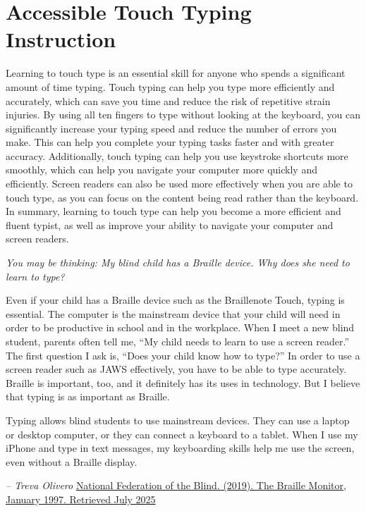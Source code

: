 \section{Accessible Touch Typing Instruction}\label{appx5}

Learning to touch type is an essential skill for anyone who spends a significant amount of time typing. Touch typing can help you type more efficiently and accurately, which can save you time and reduce the risk of repetitive strain injuries. By using all ten fingers to type without looking at the keyboard, you can significantly increase your typing speed and reduce the number of errors you make. This can help you complete your typing tasks faster and with greater accuracy. Additionally, touch typing can help you use keystroke shortcuts more smoothly, which can help you navigate your computer more quickly and efficiently. Screen readers can also be used more effectively when you are able to touch type, as you can focus on the content being read rather than the keyboard. In summary, learning to touch type can help you become a more efficient and fluent typist, as well as improve your ability to navigate your computer and screen readers.

\emph{You may be thinking: My blind child has a Braille device. Why does she need to learn to type?}

Even if your child has a Braille device such as the Braillenote Touch, typing is essential. The computer is the mainstream device that your child will need in order to be productive in school and in the workplace. When I meet a new blind student, parents often tell me, ``My child needs to learn to use a screen reader.'' The first question I ask is, ``Does your child know how to type?'' In order to use a screen reader such as JAWS effectively, you have to be able to type accurately. Braille is important, too, and it definitely has its uses in technology. But I believe that typing is as important as Braille.

Typing allows blind students to use mainstream devices. They can use a laptop or desktop computer, or they can connect a keyboard to a tablet. When I use my iPhone and type in text messages, my keyboarding skills help me use the screen, even without a Braille display.

\emph{-- Treva Olivero} \href{https://nfb.org/images/nfb/publications/fr/fr40/1/fr400103.htm}{National Federation of the Blind. (2019). The Braille Monitor, January 1997. Retrieved July 2025}


